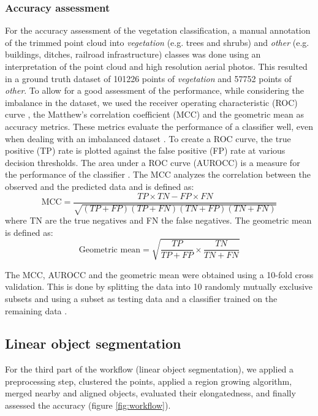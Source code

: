 \subsubsection{Accuracy assessment}
For the accuracy assessment of the vegetation classification, a manual annotation of the trimmed point cloud into \textit{vegetation} (e.g. trees and shrubs) and \textit{other} (e.g. buildings, ditches, railroad infrastructure) classes was done using an interpretation of the point cloud and high resolution aerial photos. This resulted in a ground truth dataset of 101226 points of \textit{vegetation} and 57752 points of \textit{other}. To allow for a good assessment of the performance, while considering the imbalance in the dataset, we used the receiver operating characteristic (ROC) curve \citep{bradley1997use}, the Matthew’s correlation coefficient (MCC) \citep{matthews1975comparison} and the geometric mean \citep{kubat1998machine} as accuracy metrics. These metrics evaluate the performance of a classifier well, even when dealing with an imbalanced dataset \citep{kohavi1995study, sun2009classification, lopez2013insight}. To create a ROC curve, the true positive (TP) rate is plotted against the false positive (FP) rate at various decision thresholds. The area under a ROC curve (AUROCC) is a measure for the performance of the classifier \citep{bradley1997use}. The MCC analyzes the correlation between the observed and the predicted data and is defined as:
\begin{equation}
	\label{eq:MCC}
	{\text{MCC}}={\frac{TP\times TN-FP\times FN}{{\sqrt{(TP+FP)(TP+FN)(TN+FP)(TN+FN)}}}}
\end{equation}
where TN are the true negatives and FN the false negatives. The geometric mean is defined as:
\begin{equation}
	\label{eq:geom}
	{\text{Geometric mean}}={\sqrt{\frac{TP}{TP+FP} \times \frac{TN}{TN+FN}}}
\end{equation}

The MCC, AUROCC and the geometric mean were obtained using a 10-fold cross validation. This is done by splitting the data into 10 randomly mutually exclusive subsets and using a subset as testing data and a classifier trained on the remaining data \citep{kohavi1995study}.

\subsection{Linear object segmentation}
For the third part of the workflow (linear object segmentation), we applied a preprocessing step, clustered the points, applied a region growing algorithm, merged nearby and aligned objects, evaluated their elongatedness, and finally assessed the accuracy (figure \ref{fig:workflow}).

